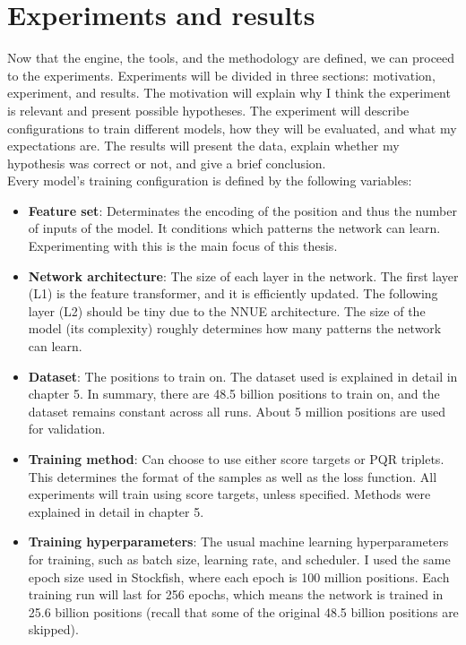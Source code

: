 \section{Experiments and results}

Now that the engine, the tools, and the methodology are defined, we can proceed to the experiments. Experiments will be divided in three sections: motivation, experiment, and results. The motivation will explain why I think the experiment is relevant and present possible hypotheses. The experiment will describe configurations to train different models, how they will be evaluated, and what my expectations are. The results will present the data, explain whether my hypothesis was correct or not, and give a brief conclusion. \\

Every model's training configuration is defined by the following variables:

\begin{itemize}
\item \textbf{Feature set}: Determinates the encoding of the position and thus the number of inputs of the model. It conditions which patterns the network can learn. Experimenting with this is the main focus of this thesis.

\item \textbf{Network architecture}: The size of each layer in the network. The first layer (L1) is the feature transformer, and it is efficiently updated. The following layer (L2) should be tiny due to the NNUE architecture. The size of the model (its complexity) roughly determines how many patterns the network can learn.

\item \textbf{Dataset}: The positions to train on. The dataset used is explained in detail in chapter 5. In summary, there are 48.5 billion positions to train on, and the dataset remains constant across all runs. About 5 million positions are used for validation.

\item \textbf{Training method}: Can choose to use either score targets or PQR triplets. This determines the format of the samples as well as the loss function. All experiments will train using score targets, unless specified. Methods were explained in detail in chapter 5.

\item \textbf{Training hyperparameters}: The usual machine learning hyperparameters for training, such as batch size, learning rate, and scheduler. I used the same epoch size used in Stockfish, where each epoch is 100 million positions. Each training run will last for 256 epochs, which means the network is trained in 25.6 billion positions (recall that some of the original 48.5 billion positions are skipped).
\end{itemize}

